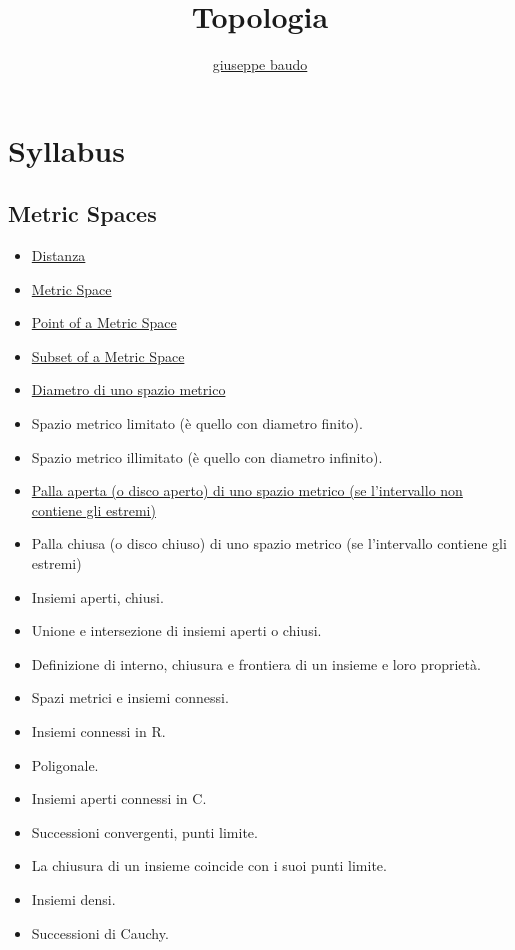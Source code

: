 \documentclass[a4paper,10pt]{article}
\title{Topologia}
\author{\href{http://www.baudo.hol.es}{giuseppe baudo}}
\begin{document}
\maketitle

\section*{Syllabus}

\subsection*{Metric Spaces}
  \begin{itemize}
    \item \href{Distanza.html}{Distanza}
    \item \href{MetricSpace.html}{Metric Space}
    \item \href{PointMetricSpace.html}{Point of a Metric Space}
    \item \href{SubsetMetricSpace.html}{Subset of a Metric Space}
    \item \href{DiametroSpazioMetrico.html}{Diametro di uno spazio metrico} 
    \item Spazio metrico limitato (è quello con diametro finito).
    \item Spazio metrico illimitato (è quello con diametro infinito). 
    \item \href{PallaAperta.html}{Palla aperta (o disco aperto) di uno spazio metrico (se l'intervallo non contiene gli estremi)}
    \item Palla chiusa (o disco chiuso) di uno spazio metrico (se l'intervallo contiene gli estremi)
    \item Insiemi aperti, chiusi. 
    \item Unione e intersezione di insiemi aperti o chiusi. 
    \item Definizione di interno, chiusura e frontiera di un insieme e loro proprietà. 
    \item Spazi metrici e insiemi connessi. 
    \item Insiemi connessi in R. 
    \item Poligonale.
    \item Insiemi aperti connessi in C. 
    \item Successioni convergenti, punti limite. 
    \item La chiusura di un insieme coincide con i suoi punti limite. 
    \item Insiemi densi. 
    \item Successioni di Cauchy.

\end{itemize}
\end{document}
